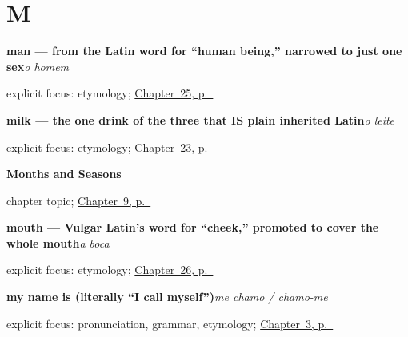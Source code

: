\section*{M}

\noindent\begin{minipage}[t]{\linewidth}
\raggedright
\textbf{man — from the Latin word for \textquotedblleft{}human being,\textquotedblright{} narrowed to just one sex}\enspace\emph{o homem}\par
\footnotesize explicit focus: etymology; \hyperref[ch:pt-people-you-introduce]{Chapter~25, p.~\pageref*{ch:pt-people-you-introduce}}
\end{minipage}\par\smallskip

\noindent\begin{minipage}[t]{\linewidth}
\raggedright
\textbf{milk — the one drink of the three that IS plain inherited Latin}\enspace\emph{o leite}\par
\footnotesize explicit focus: etymology; \hyperref[ch:pt-coffee-tea-milk]{Chapter~23, p.~\pageref*{ch:pt-coffee-tea-milk}}
\end{minipage}\par\smallskip

\noindent\begin{minipage}[t]{\linewidth}
\raggedright
\textbf{Months and Seasons}\par
\footnotesize chapter topic; \hyperref[ch:pt-months-and-seasons]{Chapter~9, p.~\pageref*{ch:pt-months-and-seasons}}
\end{minipage}\par\smallskip

\noindent\begin{minipage}[t]{\linewidth}
\raggedright
\textbf{mouth — Vulgar Latin's word for \textquotedblleft{}cheek,\textquotedblright{} promoted to cover the whole mouth}\enspace\emph{a boca}\par
\footnotesize explicit focus: etymology; \hyperref[ch:pt-body-how-are-you]{Chapter~26, p.~\pageref*{ch:pt-body-how-are-you}}
\end{minipage}\par\smallskip

\noindent\begin{minipage}[t]{\linewidth}
\raggedright
\textbf{my name is (literally \textquotedblleft{}I call myself\textquotedblright{})}\enspace\emph{me chamo / chamo-me}\par
\footnotesize explicit focus: pronunciation, grammar, etymology; \hyperref[ch:pt-introductions]{Chapter~3, p.~\pageref*{ch:pt-introductions}}
\end{minipage}\par\smallskip


